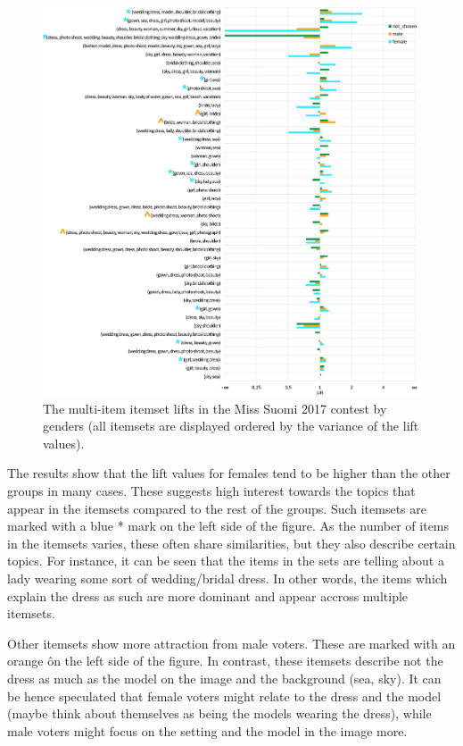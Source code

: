 \begin{figure}[]
    \begin{center}
        \includegraphics[width=1.2\textwidth,center]{Images/itemset_lifts-gender-Miss_Suomi-multi_itemsets+markup.png}
        \caption{The multi-item itemset lifts in the Miss Suomi 2017 contest by genders (all itemsets are displayed ordered by the variance of the lift values).}
        \label{itemset_lifts-gender-Miss_Suomi-multi_itemsets}
    \end{center}
\end{figure}

The results show that the lift values for females tend to be higher than the other groups in many cases. These suggests high interest towards the topics that appear in the itemsets compared to the rest of the groups. Such itemsets are marked with a blue * mark on the left side of the figure. As the number of items in the itemsets varies, these often share similarities, but they also describe certain topics. For instance, it can be seen that the items in the sets are telling about a lady wearing some sort of wedding/bridal dress. In other words, the items which explain the dress as such are more dominant and appear accross multiple itemsets. 

Other itemsets show more attraction from male voters. These are marked with an orange \^ on the left side of the figure. In contrast, these itemsets describe not the dress as much as the model on the image and the background (sea, sky). It can be hence speculated that female voters might relate to the dress and the model (maybe think about themselves as being the models wearing the dress), while male voters might focus on the setting and the model in the image more.

